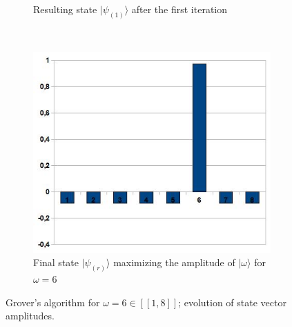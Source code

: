 \begin{figure}[ht!]
\begin{subfigure}[b]{0.40\textwidth}
            \caption{\footnotesize Resulting state $|\psi_{(1)}\rangle$ after the first iteration}
            \label{fig2:fourth}
        \end{subfigure}
        \\
        \begin{subfigure}[b]{0.40\textwidth}
            \includegraphics[width=\textwidth]{Grover-EtatFinal.jpg}
            \caption{\footnotesize Final state $|\psi_{(r)}\rangle$  maximizing the amplitude of $|\omega\rangle$ for $\omega=6$}
            \label{fig2:fifth}
        \end{subfigure}

    \caption{\small  Grover's algorithm for $\omega=6 \in [\![1,8]\!]$;  evolution of state vector amplitudes.}
    \label{fig2:subfigures}
\end{figure}

